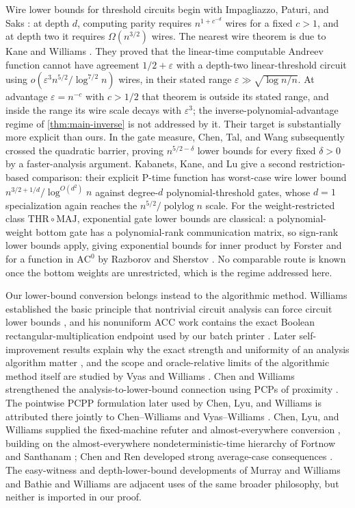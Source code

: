 \documentclass[11pt,letterpaper]{article}
\newcommand{\cref}[1]{\ref{#1}}
\theoremstyle{definition}
\theoremstyle{remark}
\begin{document}
Wire lower bounds for threshold circuits begin with Impagliazzo, Paturi,
and Saks \cite{IPS97}: at depth \(d\), computing parity requires
\(n^{1+c^{-d}}\) wires for a fixed \(c>1\), and at depth two it requires
\(\Omega(n^{3/2})\) wires. The nearest wire theorem is due to Kane and
Williams \cite[Theorem 1.1]{KW16}. They proved that the linear-time
computable Andreev function \cite{And87} cannot have agreement
\(1/2+\varepsilon\) with a depth-two linear-threshold circuit using
\(o(\varepsilon^3n^{5/2}/\log^{7/2}n)\) wires, in their stated range
\(\varepsilon\gg\sqrt{\log n/n}\). At advantage \(\varepsilon=n^{-c}\)
with \(c>1/2\) that theorem is outside its stated range, and inside the
range its wire scale decays with \(\varepsilon^3\); the
inverse-polynomial-advantage regime of \cref{thm:main-inverse} is not
addressed by it. Their target is
substantially more explicit than ours. In the gate measure, Chen, Tal,
and Wang \cite[Theorem 1.1]{CTW26} subsequently crossed the quadratic
barrier, proving \(n^{5/2-\delta}\) lower bounds for every fixed
\(\delta>0\) by a faster-analysis argument. Kabanets, Kane, and Lu
\cite[Theorem 1.1]{KKL17} give a second restriction-based comparison:
their explicit P-time function has worst-case wire lower bound
\(n^{3/2+1/d}/\log^{O(d^2)}n\) against degree-\(d\) polynomial-threshold
gates, whose \(d=1\) specialization again reaches the
\(n^{5/2}/\operatorname{polylog}n\) scale. For the weight-restricted
class \(\mathrm{THR}\circ\mathrm{MAJ}\), exponential gate lower bounds
are classical: a polynomial-weight bottom gate has a polynomial-rank
communication matrix, so sign-rank lower bounds apply, giving
exponential bounds for inner product by Forster \cite{For02} and for a
function in \(\mathrm{AC}^0\) by Razborov and Sherstov \cite{RS10}. No
comparable route is known once the bottom weights are unrestricted,
which is the regime addressed here.

Our lower-bound conversion belongs instead to the algorithmic method.
Williams established the basic principle that nontrivial circuit
analysis can force circuit lower bounds \cite{Wil13}, and his nonuniform
ACC work contains the exact Boolean rectangular-multiplication endpoint
used by our batch printer
\cite[Corollary 4.4 and Appendix C, Corollary C.2]{WilACC14}. Later
self-improvement results explain why the exact
strength and uniformity of an analysis algorithm matter \cite{Wil24},
and the scope and oracle-relative limits of the algorithmic method
itself are studied by Vyas and Williams \cite{VW23}.
Chen and Williams strengthened the analysis-to-lower-bound connection
using PCPs of proximity \cite{CW19}. The pointwise PCPP formulation later
used by Chen, Lyu, and Williams is attributed there jointly to
Chen--Williams and Vyas--Williams \cite{VW20}. Chen, Lyu, and Williams
supplied the fixed-machine refuter and almost-everywhere conversion
\cite{CLW20}, building on the almost-everywhere nondeterministic-time
hierarchy of Fortnow and Santhanam \cite{FS16}; Chen and Ren developed
strong average-case consequences \cite{CR22}. The
easy-witness and depth-lower-bound developments of Murray and Williams
\cite{MW20} and Bathie and Williams \cite{BW24} are adjacent uses of the
same broader philosophy, but neither is imported in our proof.
\end{document}
